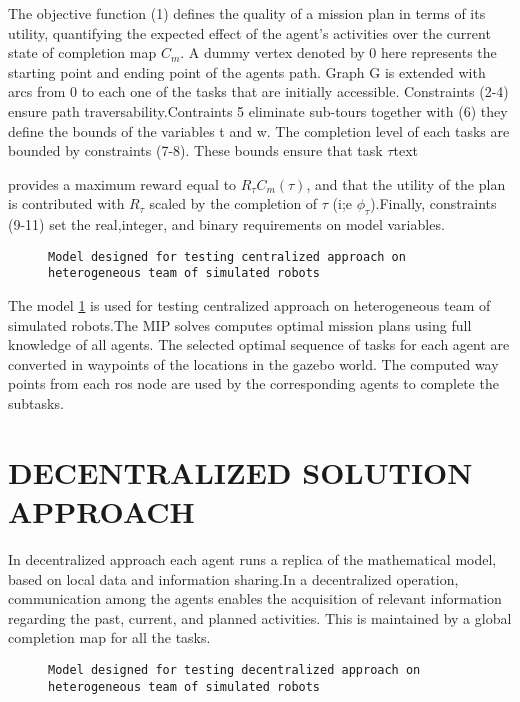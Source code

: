 \documentclass[conference]{IEEEtran}
\begin{document}
The objective function (1) defines the quality of a mission plan in terms of its utility, quantifying the expected effect of the agent's activities over the current state of completion map \(C_{m}\). A dummy vertex denoted by 0 here represents the starting point and ending point of the agents path. Graph G is extended with arcs from 0 to each one of the tasks that are initially accessible. Constraints (2-4) ensure path traversability.Contraints 5 eliminate sub-tours together with (6) they define the bounds of the variables t and w. The completion level of each tasks are bounded by constraints (7-8). These bounds ensure that task \(\tau\)text{ provides a maximum reward equal to \({R_{\tau}C_{m}(\tau)}\), and that the utility of the plan is contributed with \(R_{\tau}\) scaled by the completion of \(\tau\) (i;e \(\phi_{\tau}\)).Finally, constraints (9-11) set the real,integer, and binary requirements on model variables\cite{feo2016decentralized}.
\begin{figure}
\caption{\texttt{Model designed for testing centralized approach on heterogeneous team of simulated robots}}\label{cen_model}
\end{figure}

The model \ref{cen_model} is used for testing centralized approach on heterogeneous team of simulated robots.The MIP solves computes optimal mission plans using full knowledge of all agents. The selected optimal sequence of tasks for each agent are converted in waypoints of the locations in the gazebo world. The computed way points from each ros node are used by the corresponding agents to complete the subtasks.  

\section{DECENTRALIZED SOLUTION APPROACH}
In decentralized approach each agent runs a replica of the mathematical model, based on local data and information sharing.In a decentralized operation, communication among the agents enables the acquisition of relevant information regarding the past, current, and planned activities. This is maintained by a global completion map for all the tasks\cite{feo2016decentralized}.


\begin{figure}
\caption{\texttt{Model designed for testing decentralized approach on heterogeneous team of simulated robots}}\label{decen_model}
\end{figure}

}
\end{document}
